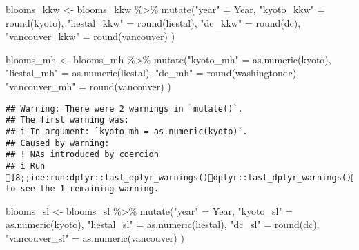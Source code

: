 \documentclass[
]{article}
\newenvironment{Shaded}{\begin{snugshade}}{\end{snugshade}}
\newcommand{\FunctionTok}[1]{\textcolor[rgb]{0.00,0.00,0.00}{#1}}
\newcommand{\NormalTok}[1]{#1}
\newcommand{\OtherTok}[1]{\textcolor[rgb]{0.56,0.35,0.01}{#1}}
\newcommand{\SpecialCharTok}[1]{\textcolor[rgb]{0.00,0.00,0.00}{#1}}
\newcommand{\StringTok}[1]{\textcolor[rgb]{0.31,0.60,0.02}{#1}}
\begin{document}
\begin{Shaded}
\begin{Highlighting}[]
\NormalTok{blooms\_kkw }\OtherTok{\textless{}{-}}\NormalTok{ blooms\_kkw }\SpecialCharTok{\%\textgreater{}\%} \FunctionTok{mutate}\NormalTok{(}\StringTok{"year"} \OtherTok{=}\NormalTok{ Year,}
                                  \StringTok{"kyoto\_kkw"} \OtherTok{=} \FunctionTok{round}\NormalTok{(kyoto),}
                                  \StringTok{"liestal\_kkw"} \OtherTok{=} \FunctionTok{round}\NormalTok{(liestal),}
                                  \StringTok{"dc\_kkw"} \OtherTok{=} \FunctionTok{round}\NormalTok{(dc),}
                                  \StringTok{"vancouver\_kkw"} \OtherTok{=} \FunctionTok{round}\NormalTok{(vancouver)}
\NormalTok{)}

\NormalTok{blooms\_mh }\OtherTok{\textless{}{-}}\NormalTok{ blooms\_mh }\SpecialCharTok{\%\textgreater{}\%} \FunctionTok{mutate}\NormalTok{(}\StringTok{"kyoto\_mh"} \OtherTok{=} \FunctionTok{as.numeric}\NormalTok{(kyoto),}
                                  \StringTok{"liestal\_mh"} \OtherTok{=} \FunctionTok{as.numeric}\NormalTok{(liestal),}
                                  \StringTok{"dc\_mh"} \OtherTok{=} \FunctionTok{round}\NormalTok{(washingtondc),}
                                  \StringTok{"vancouver\_mh"} \OtherTok{=} \FunctionTok{round}\NormalTok{(vancouver)}
\NormalTok{)}
\end{Highlighting}
\end{Shaded}

\begin{verbatim}
## Warning: There were 2 warnings in `mutate()`.
## The first warning was:
## i In argument: `kyoto_mh = as.numeric(kyoto)`.
## Caused by warning:
## ! NAs introduced by coercion
## i Run ]8;;ide:run:dplyr::last_dplyr_warnings()dplyr::last_dplyr_warnings()]8;; to see the 1 remaining warning.
\end{verbatim}

\begin{Shaded}
\begin{Highlighting}[]
\NormalTok{blooms\_sl }\OtherTok{\textless{}{-}}\NormalTok{ blooms\_sl }\SpecialCharTok{\%\textgreater{}\%} \FunctionTok{mutate}\NormalTok{(}\StringTok{"year"} \OtherTok{=}\NormalTok{ Year,}
                                  \StringTok{"kyoto\_sl"} \OtherTok{=} \FunctionTok{as.numeric}\NormalTok{(kyoto),}
                                  \StringTok{"liestal\_sl"} \OtherTok{=} \FunctionTok{as.numeric}\NormalTok{(liestal),}
                                  \StringTok{"dc\_sl"} \OtherTok{=} \FunctionTok{round}\NormalTok{(dc),}
                                  \StringTok{"vancouver\_sl"} \OtherTok{=} \FunctionTok{as.numeric}\NormalTok{(vancouver)}
\NormalTok{)}
\end{Highlighting}
\end{Shaded}
\end{document}
